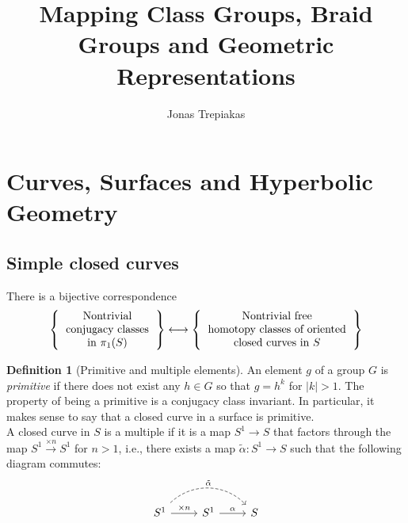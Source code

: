 \documentclass[reqno]{amsart}
\title{Mapping Class Groups, Braid Groups and Geometric Representations}
\author{Jonas Trepiakas}
\theoremstyle{definition}
\newtheorem{definition}[theorem]{Definition}
\theoremstyle{remark}
\begin{document}
\maketitle


\section{Curves, Surfaces and Hyperbolic Geometry}
    \subsection{Simple closed curves}
There is a bijective correspondence
\[
\left\{ 
    \begin{tabular}{c}
    Nontrivial\\
    conjugacy classes\\
    in $\pi_1 (S)$
\end{tabular}
\right\} 
\longleftrightarrow
\left\{ 
    \begin{tabular}{c}
        Nontrivial free\\
        homotopy classes of oriented\\
        closed curves in $S$
\end{tabular}
\right\} 
\] 

\begin{definition}[Primitive and multiple elements]
    An element $g$ of a group $G$ is \textit{primitive} if there
    does not exist any $h \in G$ so that $g = h^{k}$ for
    $\left| k \right| >1$. The property of being a primitive
    is a conjugacy class invariant. In particular, it makes
    sense to say that a closed curve in a surface is primitive.\\
    A closed curve in $S$ is a multiple if it is a map
    $S^{1} \to S$ that factors through the map
    $S^{1} \stackrel{\times n}{\to } S^{1}$ for
    $n >1$, i.e., there exists a map $\tilde{\alpha} \colon
    S^{1} \to S$ such that the following diagram commutes:
    \begin{equation*}
    \begin{tikzcd}
        S^{1} \ar[r, "\times n"] \ar[rr, bend left = 45, dashed,
        "\tilde{\alpha}"] & S^{1} \ar[r,
        "\alpha"] & S
    \end{tikzcd}
    \end{equation*}
\end{definition}
\end{document}
